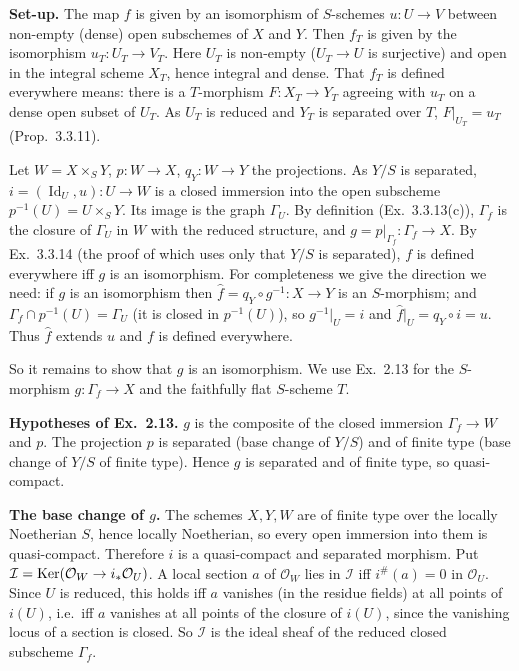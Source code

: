 \documentclass[11pt]{article}
\begin{document}
\pf
\textbf{Set-up.} The map $f$ is given by an isomorphism of $S$-schemes $u:U\to V$ between non-empty (dense) open subschemes of $X$ and $Y$. Then $f_T$ is given by the isomorphism $u_T:U_T\to V_T$. Here $U_T$ is non-empty ($U_T\to U$ is surjective) and open in the integral scheme $X_T$, hence integral and dense. That $f_T$ is defined everywhere means: there is a $T$-morphism $F:X_T\to Y_T$ agreeing with $u_T$ on a dense open subset of $U_T$. As $U_T$ is reduced and $Y_T$ is separated over $T$, $F|_{U_T}=u_T$ (Prop.~3.3.11).

Let $W=X\times_SY$, $p:W\to X$, $q_Y:W\to Y$ the projections. As $Y/S$ is separated, $i=(\operatorname{Id}_U,u):U\to W$ is a closed immersion into the open subscheme $p^{-1}(U)=U\times_SY$. Its image is the graph $\Gamma_U$. By definition (Ex.~3.3.13(c)), $\Gamma_f$ is the closure of $\Gamma_U$ in $W$ with the reduced structure, and $g=p|_{\Gamma_f}:\Gamma_f\to X$. By Ex.~3.3.14 (the proof of which uses only that $Y/S$ is separated), $f$ is defined everywhere iff $g$ is an isomorphism. For completeness we give the direction we need: if $g$ is an isomorphism then $\hat f=q_Y\circ g^{-1}:X\to Y$ is an $S$-morphism; and $\Gamma_f\cap p^{-1}(U)=\Gamma_U$ (it is closed in $p^{-1}(U)$), so $g^{-1}|_U=i$ and $\hat f|_U=q_Y\circ i=u$. Thus $\hat f$ extends $u$ and $f$ is defined everywhere.

So it remains to show that $g$ is an isomorphism. We use Ex.~2.13 for the $S$-morphism $g:\Gamma_f\to X$ and the faithfully flat $S$-scheme $T$.

\textbf{Hypotheses of Ex.~2.13.} $g$ is the composite of the closed immersion $\Gamma_f\to W$ and $p$. The projection $p$ is separated (base change of $Y/S$) and of finite type (base change of $Y/S$ of finite type). Hence $g$ is separated and of finite type, so quasi-compact.

\textbf{The base change of $g$.} The schemes $X,Y,W$ are of finite type over the locally Noetherian $S$, hence locally Noetherian, so every open immersion into them is quasi-compact. Therefore $i$ is a quasi-compact and separated morphism. Put $\mathcal I=\operatorname{Ker}(\mathcal O_W\to i_*\mathcal O_U)$. A local section $a$ of $\mathcal O_W$ lies in $\mathcal I$ iff $i^\#(a)=0$ in $\mathcal O_U$. Since $U$ is reduced, this holds iff $a$ vanishes (in the residue fields) at all points of $i(U)$, i.e.\ iff $a$ vanishes at all points of the closure of $i(U)$, since the vanishing locus of a section is closed. So $\mathcal I$ is the ideal sheaf of the reduced closed subscheme $\Gamma_f$.
\end{document}
